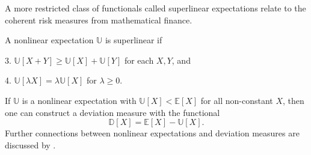 \documentclass[main.tex]{subfiles}
\begin{document}
A more restricted class of functionals called superlinear expectations
relate to the coherent risk measures from mathematical finance.
\begin{mydef}
  A nonlinear expectation $\mathbb{U}$ is superlinear if
  \begin{enumerate}
    \begin{samepage}
    \item[3.] $\mathbb{U}[X+Y]\geq \mathbb{U}[X] +\mathbb{U}[Y]$ for
      each $X,Y$, and
    \item[4.] $\mathbb{U}[\lambda X] = \lambda\mathbb{U}[X]$ for
      $\lambda\geq 0$.
    \end{samepage}
  \end{enumerate}
\end{mydef}

If $\mathbb{U}$ is a nonlinear expectation
with $\mathbb{U}[X] < \mathbb{E}[X]$ for all non-constant $X$,
then one can
construct a deviation measure with the functional
\begin{equation}
  \mathbb{D}[X]=\mathbb{E}[X]-\mathbb{U}[X].
\end{equation}
Further connections between nonlinear expectations and deviation
measures are discussed by \citet{rockafellar2013fundamental}.
\end{document}
